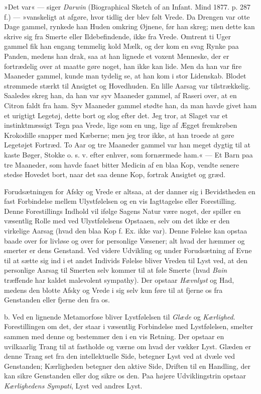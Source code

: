 \documentclass[12pt,a4paper,openany]{book}
\newcommand{\opage}[1]{\marginnote{\footnotesize\textit{[#1]}}}
\begin{document}
»Det var« --- siger \emph{Darwin} (Biographical Sketch of an Infant.
Mind 1877. p. 287 f.) --- »vanskeligt at afgøre, hvor tidlig der blev
følt Vrede. Da Drengen var otte Dage gammel, rynkede han Huden omkring
Øjnene, før han skreg; men dette kan skrive sig fra Smerte eller
Ildebefindende, ikke fra Vrede. Omtrent ti Uger gammel fik han engang
temmelig kold Mælk, og der kom en svag Rynke paa Panden, medens han
drak, saa at han lignede et voxent Menneske, der er fortrædelig over at
maatte gøre noget, han ikke kan lide. Men da han var fire Maaneder
gammel, kunde man tydelig se, at han kom i stor Lidenskab. Blodet
strømmede stærkt til Ansigtet og Hovedhuden. En lille Aarsag var
tilstrækkelig. Saaledes skreg han, da han var syv Maaneder gammel, af
Raseri over, at en Citron faldt fra ham. Syv Maaneder gammel stødte han,
da man havde givet ham et urigtigt Legetøj, dette bort og slog efter
det. Jeg tror, at Slaget var et instinktmæssigt Tegn paa Vrede, lige som
en ung, lige af Ægget fremkrøben Krokodille snapper med Kæberne; men jeg
tror ikke, at han troede at gøre Legetøjet Fortræd. To Aar og tre
Maaneder
\opage{283}gammel var han meget dygtig til at kaste Bøger, Stokke o. s.
v. efter enhver, som fornærmede ham.« --- Et Barn paa tre Maaneder, som
havde faaet bitter Medicin af en blaa Kop, vendte senere stedse Hovedet
bort, naar det saa denne Kop, fortrak Ansigtet og græd.

Forudsætningen for Afsky og Vrede er altsaa, at der danner sig i
Bevidstheden en fast Forbindelse mellem Ulystfølelsen og en vis
Iagttagelse eller Forestilling. Denne Forestillings Indhold vil ifølge
Sagens Natur være noget, der spiller en væsentlig Rolle med ved
Ulystfølelsens Opstaaen, selv om det ikke er den virkelige Aarsag (hvad
den blaa Kop f. Ex. ikke var). Denne Følelse kan opstaa baade over for
livløse og over for personlige Væsener; alt hvad der hæmmer og smerter
er dens Genstand. Ved videre Udvikling og under Forudsætning af Evne til
at sætte sig ind i et andet Individs Følelse bliver Vreden til Lyst ved,
at den personlige Aarsag til Smerten selv kommer til at føle Smerte
(hvad \emph{Bain} træffende har kaldet malevolent sympathy). Der opstaar
\emph{Hævnlyst} og Had, medens den blotte Afsky og Vrede i sig selv kun
føre til at fjerne os fra Genstanden eller fjerne den fra os.

b. Ved en lignende Metamorfose bliver Lystfølelsen til \emph{Glæde} og
\emph{Kærlighed}. Forestillingen om det, der staar i væsentlig
Forbindelse med Lystfølelsen, smelter sammen med denne og bestemmer den
i en vis Retning. Der opstaar en uvilkaarlig Trang til at fastholde og
værne om hvad der vækker Lyst. Glæden er denne Trang set fra den
intellektuelle Side, betegner Lyst ved at dvæle ved Genstanden;
Kærligheden betegner den aktive Side, Driften til en Handling, der kan
sikre Genstanden eller dog sikre os den. Paa højere Udviklingstrin
opstaar \emph{Kærlighedens Sympati}, Lyst ved andres Lyst.
\end{document}

